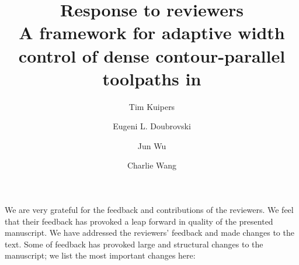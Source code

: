 \documentclass[3p,10pt,times]{elsarticle}
\theoremstyle{definition}
\newcommand{\revise}[2]{{\color{red}{#1}\color{blue}{#2}}}
\numberwithin{question}{section}
\begin{document}
\baselineskip11pt 

\begin{frontmatter} 

\title{
Response to reviewers
\\
\large{A framework for adaptive width control of dense contour-parallel toolpaths in \revise{additive manufacturing}{fused deposition modeling}}
}



\author[um,tud]{Tim Kuipers}
\author[tud]{Eugeni L. Doubrovski}
\author[tud]{Jun Wu}
\author[cuhk]{Charlie Wang}
\address[um]{Ultimaker, Utrecht, The Netherlands}
\address[tud]{Department of Design Engineering, Delft University of Technology, The Netherlands}
\address[cuhk]{Department of Mechanical and Automation Engineering, The Chinese University of Hong Kong, Hong Kong SAR, China}

%
%


\end{frontmatter}

We are very grateful for the feedback and contributions of the reviewers.
We feel that their feedback has provoked a leap forward in quality of the presented manuscript.
We have addressed the reviewers' feedback and made changes to the text.
Some of feedback has provoked large and structural changes to the manuscript;
we list the most important changes here:
\end{document}
